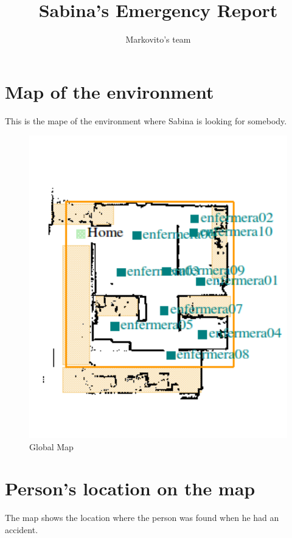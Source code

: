 \documentclass[11pt]{article}
\title{Sabina's Emergency Report }
\author{Markovito's team}
\begin{document}
\maketitle

\section{Map of the environment}
This is the mape of the environment where Sabina is looking for somebody.

\begin{figure}
	\begin{center}
		\includegraphics[width=1\textwidth]{../data/EmergencyReport/map.png}
		\caption{Global Map}
	\end{center}
\end{figure}

\section{Person's location on the map}
The map shows the location where the person was found when he had an accident.
\end{document}

